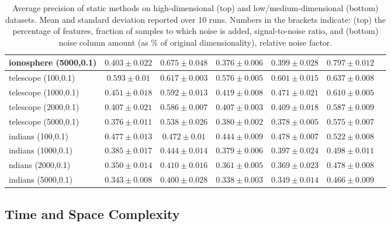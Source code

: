 \begin{footnotesize}
\begin{table}[p!]
\begin{tabular}{lcccccc}
ionosphere (5000,0.1)     & $0.403 \pm 0.022$ &  $0.675 \pm 0.048$ &  $0.376 \pm 0.006$ &  $0.399 \pm 0.028$ & $0.797 \pm  0.012$  \\
\midrule
telescope (100,0.1) & $0.593 \pm 0.01$  &  $0.617 \pm 0.003$ &  $0.576 \pm 0.005$ &  $0.601 \pm 0.015$ & $0.637 \pm  0.008$ \\
telescope (1000,0.1)& $0.451 \pm 0.018$ &  $0.592 \pm 0.013$ &  $0.419 \pm 0.008$ &  $0.471 \pm 0.021$ & $0.610 \pm  0.005$ \\
telescope (2000,0.1)& $0.407 \pm 0.021$ &  $0.586 \pm 0.007$ &  $0.407 \pm 0.003$ &  $0.409 \pm 0.018$ & $0.587 \pm  0.009$ \\
telescope (5000,0.1)& $0.376 \pm 0.011$ &  $0.538 \pm 0.026$ &  $0.380 \pm 0.002$ &  $0.378 \pm 0.005$ & $0.575 \pm  0.007$ \\
\midrule
indians (100,0.1)    & $0.477 \pm 0.013$ &  $0.472 \pm 0.01$  &  $0.444 \pm 0.009$ &  $0.478 \pm 0.007$ & $0.522 \pm  0.008$ \\
indians (1000,0.1)   & $0.385 \pm 0.017$ &  $0.444 \pm 0.014$ &  $0.379 \pm 0.006$ &  $0.397 \pm 0.024$ & $0.498 \pm  0.011$ \\
ndians (2000,0.1)   & $0.350 \pm 0.014$ &  $0.410 \pm 0.016$ &  $0.361 \pm 0.005$ &  $0.369 \pm 0.023$ & $0.478 \pm  0.008$ \\
indians (5000,0.1)   & $0.343 \pm 0.008$ &  $0.400 \pm 0.028$ &  $0.338 \pm 0.003$ &  $0.349 \pm 0.014$ & $0.466 \pm  0.009$ \\
				\bottomrule
		\end{tabular}
		\caption{Average precision of static methods on high-dimensional (top) and low/medium-dimensional (bottom) datasets. Mean and standard deviation reported over 10 runs. Numbers in the brackets indicate: (top) the percentage of features, fraction of samples to which noise is added, signal-to-noise ratio, and (bottom) noise column amount (as $\%$ of original dimensionality), relative noise factor.}
		\label{table:static-results}
\end{table}
\end{footnotesize}

\subsection{Time and Space Complexity}
%
%

